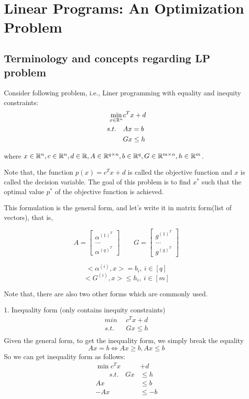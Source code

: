 
\section{Linear Programs: An Optimization Problem}
\subsection{Terminology and concepts regarding LP problem}
Consider following problem, i.e., Liner programming with equality and inequity constraints:
\begin{align*}
	\min_{x\in \mathbb{R}^n}& c^Tx + d\\
	s.t. \quad &Ax = b\\
	&Gx \leq h
\end{align*}

where $x\in \mathbb{R}^n, c\in \mathbb{R}^n, d\in \mathbb{R}, A\in \mathbb{R}^{q\times n}, b\in \mathbb{R}^q, G\in \mathbb{R}^{m\times n}, h\in \mathbb{R}^m$.

Note that, the function $p(x)=c^Tx + d$ is called the objective function and $x$ is called the decision variable. The goal of this problem is to find $x^*$ such that the optimal value $p^*$ of the objective function is achieved.

This formulation is the general form, and let's write it in matrix form(list of vectors), that is,

$$
A = 
\begin{bmatrix}
\alpha^{(1)^T}\\
...\\
\alpha^{(q)^T}
\end{bmatrix}
\qquad	
G = 
\begin{bmatrix}
g^{(1)^T}\\
...\\
g^{(q)^T}
\end{bmatrix}
$$

$$<\alpha^{(i)}, x> =b_i,\ i\in \left[q\right]$$
$$<G^{(i)}, x>\leq h_i,\ i\in \left[m\right]$$

Note that, there are also two other forms which are commonly used.

1. Inequality form (only contains inequity constraints)
\begin{align*}
	min \,\,\, &c^Tx+d\\
	s.t. \,\,\, &Gx\leq h\\
\end{align*}
Given the general form, to get the inequality form, we simply break the equality
\begin{equation*}
	Ax = b \Leftrightarrow Ax\geq b, Ax\leq b
\end{equation*}
So we can get inequality form as follows:
\begin{align*}
	\min c^Tx&+d\\
	\qquad s.t. \quad Gx &\leq h\\
	Ax &\leq b\\
	-Ax &\leq -b
\end{align*}

